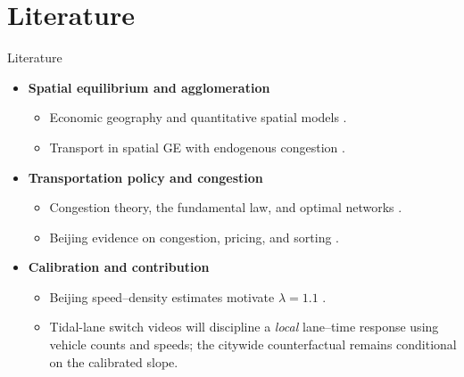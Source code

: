 \documentclass[11pt,aspectratio=169]{beamer}
\newcommand{\good}[1]{\textcolor{blue!70!black}{#1}}
\begin{document}
\section{Literature}
\begin{frame}{Literature}
\begin{itemize}\small
  \item \textbf{Spatial equilibrium and agglomeration}
  \begin{itemize}\footnotesize
    \item Economic geography and quantitative spatial models \citep{krugman1991,eaton2002,allen2014,ahlfeldt2015}.
    \item Transport in spatial GE with endogenous congestion \citep{allenarkolakis2022}.
  \end{itemize}
  \item \textbf{Transportation policy and congestion}
  \begin{itemize}\footnotesize
    \item Congestion theory, the fundamental law, and optimal networks \citep{vickrey1969,duranton2011,fajgelbaum2020}.
    \item Beijing evidence on congestion, pricing, and sorting \citep{barwick2024,yang2020}.
  \end{itemize}
  \item \textbf{Calibration and contribution}
  \begin{itemize}\footnotesize
    \item Beijing speed--density estimates motivate \good{$\lambda=1.1$} \citep{barwick2024}.
    \item Tidal-lane switch videos will discipline a \emph{local} lane--time response using vehicle counts and speeds; the citywide counterfactual remains conditional on the calibrated slope.
  \end{itemize}
\end{itemize}
\end{frame}

\end{document}
